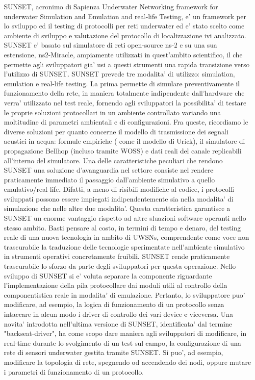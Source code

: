 SUNSET, acronimo di Sapienza Underwater Networking framework for underwater Simulation and Emulation and real-life Testing, e' un framework per lo sviluppo ed il testing di protocolli per reti underwater ed e' stato scelto come ambiente di sviluppo e valutazione del protocollo di localizzazione ivi analizzato.
SUNSET e' basato sul simulatore di reti open-source ns-2 e su una sua estensione, ns2-Miracle, ampiamente utilizzati in quest'ambito scientifico, il che permette agli sviluppatori gia' usi a questi strumenti una rapida transizione verso l'utilizzo di SUNSET.
SUNSET prevede tre modalita' di utilizzo: simulation, emulation e real-life testing.
La prima permette di simulare preventivamente il funzionamento della rete, in maniera totalmente indipendente dall'hardware che verra' utilizzato nel test reale, fornendo agli sviluppatori la possibilita' di testare le proprie soluzioni protocollari in un ambiente controllato variando una moltitudine di parametri ambientali e di configurazioni. Fra queste, ricordiamo le diverse soluzioni per quanto concerne il modello di trasmissione dei segnali acustici in acqua: formule empiriche ( come il modello di Urick), il simulatore di propagazione Bellhop (incluso tramite WOSS) e dati reali del canale replicabili all'interno del simulatore.
Una delle caratteristiche peculiari che rendono SUNSET una soluzione d'avanguardia nel settore consiste nel rendere praticamente immediato il passaggio dall'ambiente simulativo a quello emulativo/real-life. Difatti, a meno di risibili modifiche al codice, i protocolli sviluppati possono essere impiegati indipendentemente sia nella modalita' di simulazione che nelle altre due modalita'. Questa caratteristica garantisce a SUNSET un enorme vantaggio rispetto ad altre sluazioni software operanti nello stesso ambito. Basti pensare al costo, in termini di tempo e denaro, del testing reale di una nuova tecnologia in ambito di UWSNs, comprendente come voce non trascurabile la traduzione delle tecnologie sperimentate nell'ambiente simulativo in strumenti operativi concretamente fruibili. SUNSET rende praticamente trascurabile lo sforzo da parte degli sviluppatori per questa operazione.
Nello sviluppo di SUNSET si e' voluta separare la componente riguardante l'implementazione della pila protocollare dai moduli utili al controllo della componentistica reale in modalita' di emulazione. Pertanto, lo sviluppatore puo' modificare, ad esempio, la logica di funzionamento di un protocollo senza intaccare in alcun modo i driver di controllo dei vari device e viceversa.
Una novita' introdotta nell'ultima versione di SUNSET, identificata' dal termine "backseat-driver", ha come scopo dare maniera agli sviluppatori di modificare, in real-time durante lo svolgimento di un test sul campo, la configurazione di una rete di sensori underwater gestita tramite SUNSET. Si puo', ad esempio, modificare la topologia di rete, spegnendo od accendendo dei nodi, oppure mutare i parametri di funzionamento di un protocollo.
